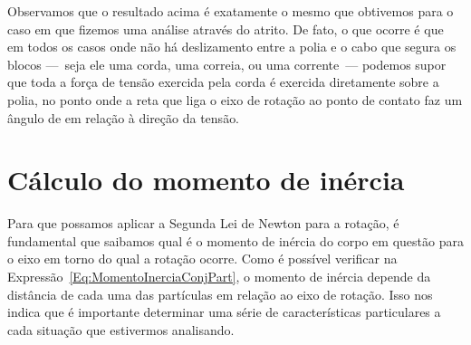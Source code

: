 Observamos que o resultado acima é exatamente o mesmo que obtivemos para o caso em que fizemos uma análise através do atrito. De fato, o que ocorre é que em todos os casos onde não há deslizamento entre a polia e o cabo que segura os blocos ---~seja ele uma corda, uma correia, ou uma corrente~--- podemos supor que toda a força de tensão exercida pela corda é exercida diretamente sobre a polia, no ponto onde a reta que liga o eixo de rotação ao ponto de contato faz um ângulo de  em relação à direção da tensão.

\section{Cálculo do momento de inércia}

Para que possamos aplicar a Segunda Lei de Newton para a rotação, é fundamental que saibamos qual é o momento de inércia do corpo em questão para o eixo em torno do qual a rotação ocorre. Como é possível verificar na Expressão~\ref{Eq:MomentoInerciaConjPart}, o momento de inércia depende da distância de cada uma das partículas em relação ao eixo de rotação. Isso nos indica que é importante determinar uma série de características particulares a cada situação que estivermos analisando.

